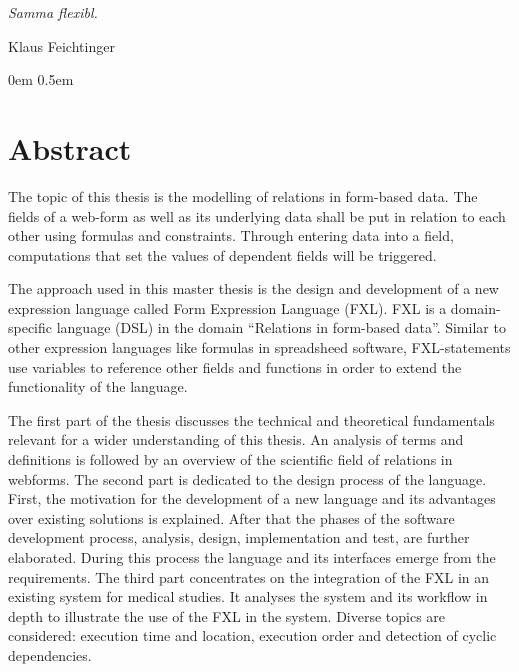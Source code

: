 \documentclass [11pt,smallheadings, a4paper]{report}
\begin{document}
\newenvironment{myquote}%
{\begin{quote}\small}%
{\end{quote}}%


\noindent
\emph{Samma flexibl.}
\begin{flushright}
Klaus Feichtinger
\end{flushright}
\pagestyle{headings}
\renewcommand{\baselinestretch}{0.9}\normalsize
\tableofcontents


\pagestyle{headings}



\parindent0em
\parskip0.5em

\sloppy 

\renewcommand{\baselinestretch}{1.0}\normalsize

\chapter*{Abstract}

The topic of this thesis is the modelling of relations in form-based data.
The fields of a web-form as well as its underlying data shall be put in relation to each other using formulas and constraints. Through entering data into a field, computations that set the values of dependent fields will be triggered.

The approach used in this master thesis is the design and development of a new expression language called Form Expression Language (FXL). FXL is a domain-specific language (DSL) in the domain ``Relations in form-based data''. Similar to other expression languages like formulas in spreadsheed software, FXL-statements use variables to reference other fields and functions in order to extend the functionality of the language.

The first part of the thesis discusses the technical and theoretical fundamentals relevant for a wider understanding of this thesis. An analysis of terms and definitions is followed by an overview of the scientific field of relations in webforms. The second part is dedicated to the design process of the language. First, the motivation for the development of a new language and its advantages over existing solutions is explained. After that the phases of the software development process, analysis, design, implementation and test, are further elaborated. During this process the language and its interfaces emerge from the requirements.
The third part concentrates on the integration of the FXL in an existing system for medical studies. It analyses the system and its workflow in depth to illustrate the use of the FXL in the system. Diverse topics are considered: execution time and location, execution order and detection of cyclic dependencies.
\end{document}
